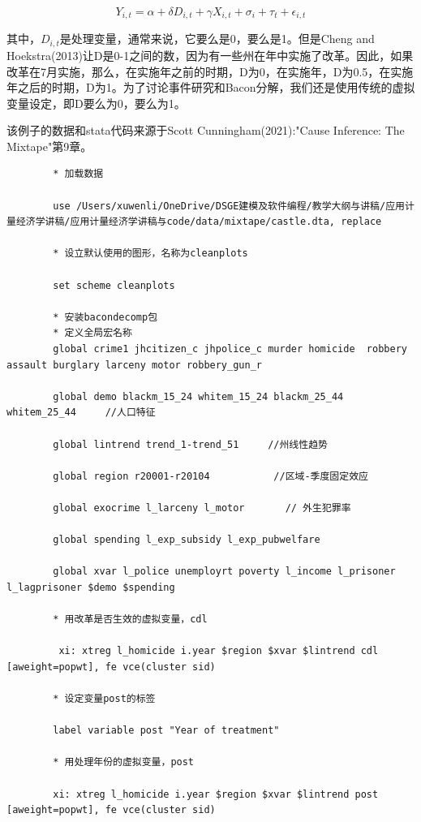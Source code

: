 \documentclass[cn,12pt,math=newtx,citestyle=gb7714-2015,bibstyle=gb7714-2015]{elegantbook}
\begin{document}
    \begin{equation}
    	Y_{i,t} = \alpha +\delta D_{i,t} +\gamma X_{i,t} +\sigma_{i} +\tau_t +\epsilon_{i,t}
    \end{equation}

    其中，$D_{i,t} $是处理变量，通常来说，它要么是0，要么是1。但是Cheng and Hoekstra(2013)让D是0-1之间的数，因为有一些州在年中实施了改革。因此，如果改革在7月实施，那么，在实施年之前的时期，D为0，在实施年，D为0.5，在实施年之后的时期，D为1。为了讨论事件研究和Bacon分解，我们还是使用传统的虚拟变量设定，即D要么为0，要么为1。

    该例子的数据和stata代码来源于Scott Cunningham(2021):"Cause Inference: The Mixtape"第9章。
    
    \begin{lstlisting}
    	* 加载数据
    	
    	use /Users/xuwenli/OneDrive/DSGE建模及软件编程/教学大纲与讲稿/应用计量经济学讲稿/应用计量经济学讲稿与code/data/mixtape/castle.dta, replace
    	
    	* 设立默认使用的图形，名称为cleanplots
    	
    	set scheme cleanplots
    	
    	* 安装bacondecomp包
    	* 定义全局宏名称
    	global crime1 jhcitizen_c jhpolice_c murder homicide  robbery assault burglary larceny motor robbery_gun_r 
    	
    	global demo blackm_15_24 whitem_15_24 blackm_25_44 whitem_25_44     //人口特征
    	
    	global lintrend trend_1-trend_51     //州线性趋势
    	
    	global region r20001-r20104           //区域-季度固定效应
    	
    	global exocrime l_larceny l_motor       // 外生犯罪率
    	
    	global spending l_exp_subsidy l_exp_pubwelfare
    	
    	global xvar l_police unemployrt poverty l_income l_prisoner l_lagprisoner $demo $spending
    	
    	* 用改革是否生效的虚拟变量，cdl
    	
    	 xi: xtreg l_homicide i.year $region $xvar $lintrend cdl [aweight=popwt], fe vce(cluster sid)
    	
    	* 设定变量post的标签
    	
    	label variable post "Year of treatment"
    	
    	* 用处理年份的虚拟变量，post
    	
    	xi: xtreg l_homicide i.year $region $xvar $lintrend post [aweight=popwt], fe vce(cluster sid)
    	
    	
    	
    \end{lstlisting}
\end{document}

